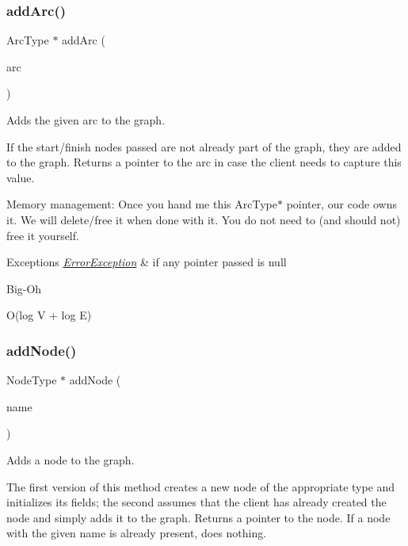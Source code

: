 \subsubsection{\texorpdfstring{add\+Arc()}{addArc()}\hspace{0.1cm}{\footnotesize\ttfamily [3/3]}}
{\footnotesize\ttfamily Arc\+Type $\ast$ add\+Arc (\begin{DoxyParamCaption}\item[{Arc\+Type $\ast$}]{arc }\end{DoxyParamCaption})}



Adds the given arc to the graph. 

If the start/finish nodes passed are not already part of the graph, they are added to the graph. Returns a pointer to the arc in case the client needs to capture this value.

Memory management\+: Once you hand me this Arc\+Type$\ast$ pointer, our code owns it. We will delete/free it when done with it. You do not need to (and should not) free it yourself.


\begin{DoxyExceptions}{Exceptions}
{\em \mbox{\hyperlink{classErrorException}{Error\+Exception}}} & if any pointer passed is null \\
\hline
\end{DoxyExceptions}
\begin{DoxyRefDesc}{Big-\/\+Oh}
\item[\mbox{\hyperlink{BigOh__BigOh000044}{Big-\/\+Oh}}]O(log V + log E) \end{DoxyRefDesc}
\mbox{\label{classGraph_acd763aa09491315536b5d2734cd82b89}} 
\subsubsection{\texorpdfstring{add\+Node()}{addNode()}\hspace{0.1cm}{\footnotesize\ttfamily [1/2]}}
{\footnotesize\ttfamily Node\+Type $\ast$ add\+Node (\begin{DoxyParamCaption}\item[{const std\+::string \&}]{name }\end{DoxyParamCaption})}



Adds a node to the graph. 

The first version of this method creates a new node of the appropriate type and initializes its fields; the second assumes that the client has already created the node and simply adds it to the graph. Returns a pointer to the node. If a node with the given name is already present, does nothing.

